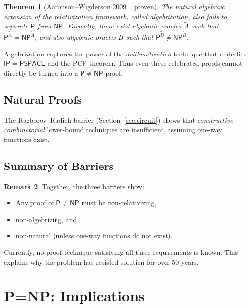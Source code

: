 \documentclass[12pt,a4paper]{amsart}
\newtheorem{theorem}{Theorem}[section]
\theoremstyle{definition}
\newtheorem{remark}[theorem]{Remark}
\newcommand{\Pclass}{\mathsf{P}}
\newcommand{\NP}{\mathsf{NP}}
\newcommand{\PSPACE}{\mathsf{PSPACE}}
\begin{document}
\begin{theorem}[Aaronson--Wigderson 2009~\cite{aaronson2009}, proven]
The natural \emph{algebraic extension} of the relativization framework, called
\emph{algebrization}, also fails to separate $\Pclass$ from $\NP$.  Formally,
there exist algebraic oracles $\tilde{A}$ such that $\Pclass^{\tilde{A}} =
\NP^{\tilde{A}}$, and also algebraic oracles $\tilde{B}$ such that
$\Pclass^{\tilde{B}} \neq \NP^{\tilde{B}}$.
\end{theorem}

Algebrization captures the power of the \emph{arithmetization} technique that
underlies $\mathsf{IP}=\PSPACE$ and the PCP theorem.  Thus even these
celebrated proofs cannot directly be turned into a $\Pclass\neq\NP$ proof.

\subsection{Natural Proofs}

The Razborov--Rudich barrier (Section~\ref{sec:circuit}) shows that
\emph{constructive combinatorial} lower-bound techniques are insufficient,
assuming one-way functions exist.

\subsection{Summary of Barriers}

\begin{remark}
Together, the three barriers show:
\begin{itemize}
  \item Any proof of $\Pclass\neq\NP$ must be non-relativizing,
  \item non-algebrizing, and
  \item non-natural (unless one-way functions do not exist).
\end{itemize}
Currently, no proof technique satisfying all three requirements is known.  This
explains why the problem has resisted solution for over 50 years.
\end{remark}

\section{P=NP: Implications}
\label{sec:implications}
\end{document}
